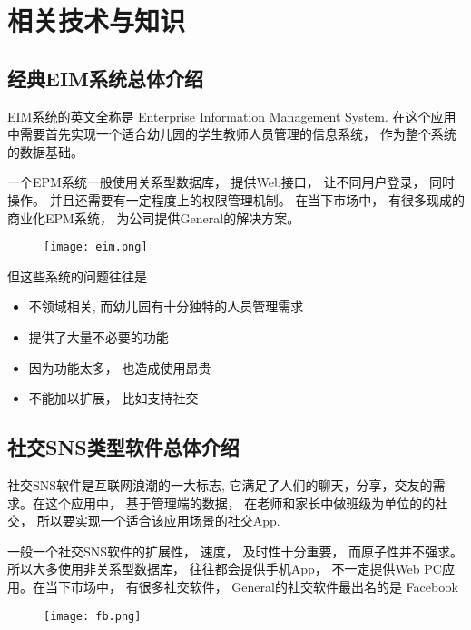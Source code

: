 \chapter{相关技术与知识}


\section{经典EIM系统总体介绍}

EIM系统的英文全称是 Enterprise Information Management System.  在这个应用中需要首先实现一个适合幼儿园的学生教师人员管理的信息系统， 作为整个系统的数据基础。




一个EPM系统一般使用关系型数据库， 提供Web接口， 让不同用户登录， 同时操作。 并且还需要有一定程度上的权限管理机制。  在当下市场中， 有很多现成的商业化EPM系统， 为公司提供General的解决方案。 


\begin{figure}[H]
	\centering
	\texttt{[image: eim.png]}
	\label{fig: Enterprise Information Management System}
\end{figure}


但这些系统的问题往往是

\begin{itemize}
\item 不领域相关, 而幼儿园有十分独特的人员管理需求
\item 提供了大量不必要的功能
\item 因为功能太多， 也造成使用昂贵
\item 不能加以扩展， 比如支持社交
\end{itemize}

\section{社交SNS类型软件总体介绍}



社交SNS软件是互联网浪潮的一大标志, 它满足了人们的聊天，分享，交友的需求。在这个应用中， 基于管理端的数据， 在老师和家长中做班级为单位的的社交， 所以要实现一个适合该应用场景的社交App.




一般一个社交SNS软件的扩展性， 速度， 及时性十分重要， 而原子性并不强求。 所以大多使用非关系型数据库， 往往都会提供手机App， 不一定提供Web PC应用。在当下市场中， 有很多社交软件， General的社交软件最出名的是 Facebook


\begin{figure}[H]
	\centering
	\texttt{[image: fb.png]}
	\label{fig: fb}
\end{figure}


